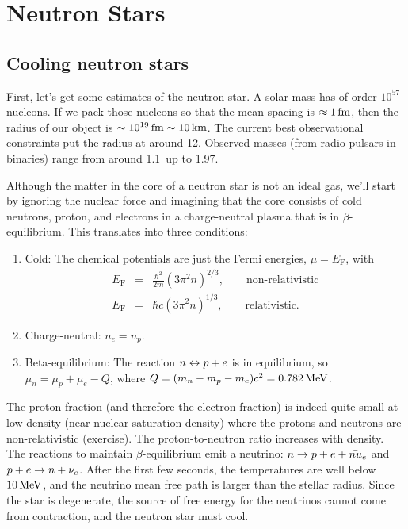 \chapter{Neutron Stars}

\section{Cooling neutron stars}\label{s.cooling-neutron-stars}
First, let's get some estimates of the neutron star.  A solar mass has of order $10^{57}$ nucleons.  If we pack those nucleons so that the mean spacing is $\approx 1\,\mathrm{fm}$, then the radius of our object is $\sim 10^{19}\,\mathrm{fm}\sim 10\,\mathrm{k}\mathrm{m}$.  The current best observational constraints put the radius at around 12\nsp\km.  Observed masses (from radio pulsars in binaries) range from around 1.1\nsp\Msun\ up to 1.97\nsp\Msun.

Although the matter in the core of a neutron star is not an ideal gas, we'll start by ignoring the nuclear force and imagining that the core consists of cold  neutrons, proton, and electrons in a charge-neutral plasma that is in $\beta$-equilibrium. This translates into three conditions:
\begin{enumerate}
\item\label{cold-neutron-star} Cold: The chemical potentials are just the Fermi energies, $\mu = E_{\mathrm{F}}$, with
\begin{eqnarray}
	E_{\mathrm{F}} &=& \frac{\hbar^{2}}{2m}\left(3\pi^{2}n\right)^{2/3},\qquad\textrm{non-relativistic}\\
	E_{\mathrm{F}} &=& \hbar c\left(3\pi^{2}n\right)^{1/3},\qquad\textrm{relativistic}.
\end{eqnarray}
\item\label{charge-neutral-star} Charge-neutral: $n_{e} = n_{p}$.
\item\label{beta-equil-star} Beta-equilibrium: The reaction $n\leftrightarrow p+e$ is in equilibrium, so 
$ \mu_{n} = \mu_{p}+\mu_{e} - Q$,
where $Q = (m_{n}-m_{p}-m_{e})c^{2} = 0.782\,\mathrm{M}\mathrm{eV}$.
\end{enumerate}

The proton fraction (and therefore the electron fraction) is indeed quite small at low density (near nuclear saturation density) where the protons and neutrons are non-relativistic (exercise).  The proton-to-neutron ratio increases with density.  The reactions to maintain $\beta$-equilibrium emit a neutrino: $n \to p + e + \bar{nu}_{e}$ and $p + e \to n + \nu_{e}$.  After the first few seconds, the temperatures are well below $10\,\mathrm{M}\mathrm{eV}$, and the neutrino mean free path is larger than the stellar radius.  Since the star is degenerate, the source of free energy for the neutrinos cannot come from contraction, and the neutron star must cool.

